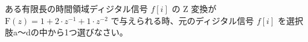 ある有限長の時間領域ディジタル信号 $f[i]$ の Z 変換が $\textrm{F}(z) = 1 + 2 \cdot z^{-1} + 1 \cdot z^{-2}$ で与えられる時、元のディジタル信号 $f[i]$ を選択肢a〜dの中から1つ選びなさい。
